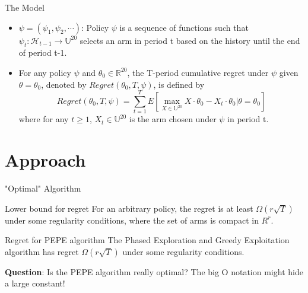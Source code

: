 \documentclass[serif]{beamer}
\begin{document}
\begin{frame}{The Model}
\begin{itemize}
\item<1-> $\psi=(\psi_{1},\psi_{2},\cdots)$: Policy $\psi$ is a sequence of functions such that $\psi_{t}:\mathscr{H}_{t-1}\rightarrow \mathbb{U}^{20}$ selects an arm in period t based on the history until the end of period t-1.
\item<2-> For any policy $\psi$ and $\theta_{0}\in \mathbb{R}^{20}$, the T-period cumulative regret under $\psi$ given $\theta=\theta_{0}$, denoted by $Regret(\theta_{0},T,\psi)$, is defined by
\begin{equation}
Regret(\theta_{0},T,\psi)=\sum_{t=1}^{T}E\left[\max_{X\in \mathbb{U}^{20}}X\cdot\theta_{0}-X_{t}\cdot\theta_{0}|\theta=\theta_{0}\right] \nonumber
\end{equation}
where for any $t\geq 1$, $X_{t}\in \mathbb{U}^{20}$ is the arm chosen under $\psi$ in period t.


\end{itemize}
\end{frame}


\section{Approach}
\tableofcontents[currentsection,subsectionstyle=hide]





\begin{frame}{"Optimal" Algorithm}
\begin{block}{Lower bound for regret}
For an arbitrary policy, the regret is at least $\Omega(r\sqrt{T})$ under some regularity conditions, where the set of arms is compact in $R^{r}$.
\end{block}

\begin{block}{Regret for PEPE algorithm}
The Phased Exploration and Greedy Exploitation algorithm has regret $\Omega(r\sqrt{T})$ under some regularity conditions.
\end{block}


\textbf{Question}: Is the PEPE algorithm really optimal? The big O notation might hide a large constant!
\end{frame}
\end{document}
